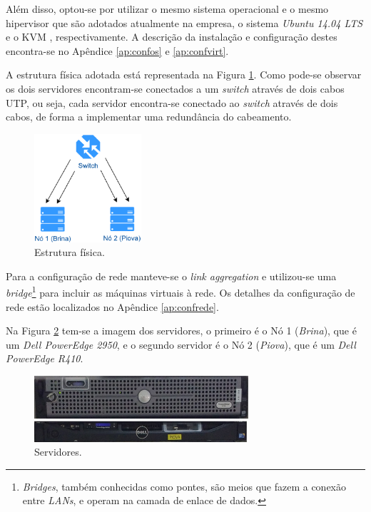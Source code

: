 Além disso, optou-se por utilizar o mesmo sistema operacional e o mesmo hipervisor que são adotados atualmente na empresa, o sistema 
\textit{Ubuntu 14.04 \ac{LTS}} e o \ac{KVM} \cite{kvm}, respectivamente. A descrição da instalação e configuração destes encontra-se no 
Apêndice \ref{ap:confos} e \ref{ap:confvirt}.

A estrutura física adotada está representada na Figura \ref{fig:projeto_fisico}. Como pode-se observar os dois servidores encontram-se conectados 
a um \textit{switch} através de dois cabos UTP, ou seja, cada servidor encontra-se conectado ao \textit{switch} através de dois cabos, de forma a 
implementar uma redundância do cabeamento.

\begin{figure}[h!]
 \centering
 \includegraphics[width=150px]{img/projeto_fisico.eps}
 \caption{Estrutura física.}
 \label{fig:projeto_fisico}
\end{figure}

Para a configuração de rede manteve-se o \textit{link aggregation} e utilizou-se uma \textit{bridge}\footnote{\textit{Bridges}, também conhecidas
como pontes, são meios que fazem a conexão entre \textit{LANs}, e operam na camada de enlace de dados.} para incluir as máquinas virtuais à rede. 
Os detalhes da configuração de rede estão localizados no Apêndice \ref{ap:confrede}.

Na Figura \ref{fig:servidores_brina_piova} tem-se a imagem dos servidores, o primeiro é o Nó 1 (\textit{Brina}), que é um 
\textit{Dell PowerEdge 2950}, e o segundo servidor é o Nó 2 (\textit{Piova}), que é um \textit{Dell PowerEdge R410}.

\begin{figure}[h!]
 \centering
 \includegraphics[width=300px]{img/servidores_brina_piova.eps}
 \caption{Servidores.}
 \label{fig:servidores_brina_piova}
\end{figure}


